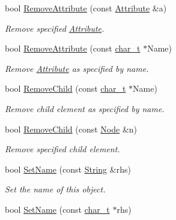 \begin{DoxyCompactItemize}
bool \hyperlink{classphys_1_1xml_1_1Node_a9a0bec16ad12b7e0f7ed4cfd7c05a1f4}{RemoveAttribute} (const \hyperlink{classphys_1_1xml_1_1Attribute}{Attribute} \&a)
\begin{DoxyCompactList}\small\item\em Remove specified \hyperlink{classphys_1_1xml_1_1Attribute}{Attribute}. \item\end{DoxyCompactList}\item 
bool \hyperlink{classphys_1_1xml_1_1Node_ab166876c5dd5a43a16eb0a4c110be7ca}{RemoveAttribute} (const \hyperlink{namespacephys_1_1xml_afc87705cd1c2917d87b879715a2d8f6e}{char\_\-t} $\ast$Name)
\begin{DoxyCompactList}\small\item\em Remove \hyperlink{classphys_1_1xml_1_1Attribute}{Attribute} as specified by name. \item\end{DoxyCompactList}\item 
bool \hyperlink{classphys_1_1xml_1_1Node_a2612e301caa54ac6af135b8fb11b2e25}{RemoveChild} (const \hyperlink{namespacephys_1_1xml_afc87705cd1c2917d87b879715a2d8f6e}{char\_\-t} $\ast$Name)
\begin{DoxyCompactList}\small\item\em Remove child element as specified by name. \item\end{DoxyCompactList}\item 
bool \hyperlink{classphys_1_1xml_1_1Node_a946bb656b94c9d3a561200cd2cd3ee11}{RemoveChild} (const \hyperlink{classphys_1_1xml_1_1Node}{Node} \&n)
\begin{DoxyCompactList}\small\item\em Remove specified child element. \item\end{DoxyCompactList}\item 
bool \hyperlink{classphys_1_1xml_1_1Node_ab5a893222458e5817342373a0bd59ffe}{SetName} (const \hyperlink{namespacephys_1_1xml_a4d8ca7638328d16d303e5a4c849f4704}{String} \&rhs)
\begin{DoxyCompactList}\small\item\em Set the name of this object. \item\end{DoxyCompactList}\item 
bool \hyperlink{classphys_1_1xml_1_1Node_ab686e72f297e120682e7278538fa7e66}{SetName} (const \hyperlink{namespacephys_1_1xml_afc87705cd1c2917d87b879715a2d8f6e}{char\_\-t} $\ast$rhs)

\end{DoxyCompactItemize}
